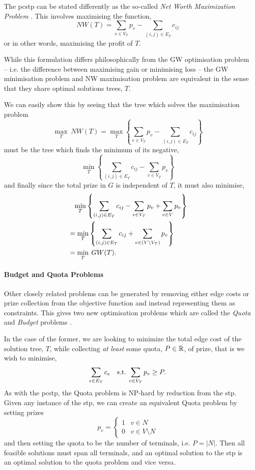  The \gls{pcstp} can be stated differently as the so-called {\textit{Net Worth Maximization Problem}} \citep{Johnson:2000:PCS:338219.338637}.
  This involves maximising the function,
\[NW(T) = \sum_{v \in V_T} p_v - \sum_{(i,j) \in E_T} c_{ij}\]
or in other words, maximising the profit of $T$.

While this formulation differs philosophically from the GW optimisation problem
-- i.e. the difference between maximising gain or minimising loss --
the GW minimisation problem and NW maximisation problem are equivalent in the sense that they share optimal solutions trees, $T$.


We can easily show this by seeing that the tree which solves the maximisation problem
\[\max_T \: NW(T) = \max_T \left\{ \sum_{v \in V_T} p_v - \sum_{(i,j) \in E_T} c_{ij} \right\}\]
must be the tree which finds the minimum of its negative,
\[\min_T \left\{ \sum_{(i,j) \in E_T} c_{ij} - \sum_{v \in V_T} p_v\right\}\]
and finally since the total prize in $G$ is independent of $T$, it must also minimise,
\begin{align*}
  &\phantom{=}\min_T \left\{ \sum_{(i,j) \in E_T} c_{ij} - \sum_{v \in V_T} p_v + \sum_{v \in V} p_v \right\} \\
  &=\min_T \left\{ \sum_{(i,j) \in E_T} c_{ij} + \sum_{v \in (V \setminus V_T)} p_v \right\} \\
  &= \min_T \: GW(T)\mathnormal{.}
\end{align*}

\paragraph{Budget and Quota Problems}

Other closely related problems can be generated by removing either edge costs or prize collection from the
objective function and instead representing them as constraints. This gives two new optimisation problems
which are called the \textit{Quota} and \textit{Budget} problems \citep{Johnson:2000:PCS:338219.338637}.

In the case of the former, we are looking to minimize the total edge cost of the solution tree, $T$, while
collecting \textit{at least} some quota, $P \in \mathbb{R}$, of prize, that is we wish to minimise,
\[\sum_{e \in E_T} c_e \quad \text{s.t.} \: \sum_{v \in V_T} p_v \geq P\mathnormal{.}\]
As with the \gls{pcstp}, the Quota problem is NP-hard by reduction from the \gls{stp}. Given any instance of the \gls{stp},
we can create an equivalent Quota problem by setting prizes
$$p_v =
\begin{cases}
  1 & v \in N \\
  0 & v \in V \setminus N
\end{cases}
$$
and then setting the quota to be the number of terminals, i.e. $P = |N|$. Then all feasible solutions
must span all terminals, and an optimal solution to the \gls{stp} is an optimal solution to the quota problem
 and vice versa.

